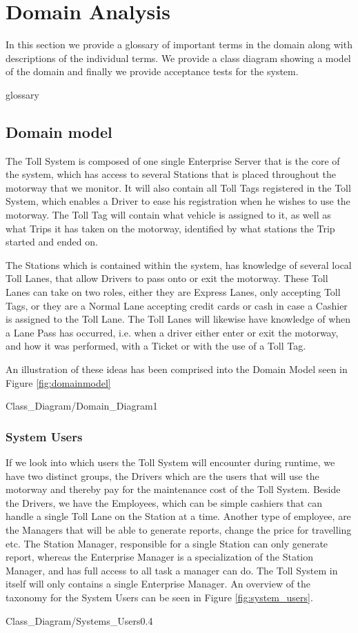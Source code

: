 \section{Domain Analysis}
In this section we provide a glossary of important terms in the domain along with descriptions of the individual terms. We provide a class diagram showing a model of the domain and finally we provide acceptance tests for the system.

{glossary}

\subsection{Domain model}
\madeby{\kj}{\mt}
The Toll System is composed of one single Enterprise Server that is the core of the system, which has access to several Stations that is placed throughout the motorway that we monitor. It will also contain all Toll Tags registered in the Toll System, which enables a Driver to ease his registration when he wishes to use the motorway. The Toll Tag will contain what vehicle is assigned to it, as well as what Trips it has taken on the motorway, identified by what stations the Trip started and ended on. 

The Stations which is contained within the system, has knowledge of several local Toll Lanes, that allow Drivers to pass onto or exit the motorway. These Toll Lanes can take on two roles, either they are Express Lanes, only accepting Toll Tags, or they are a Normal Lane accepting credit cards or cash in case a Cashier is assigned to the Toll Lane. The Toll Lanes will likewise have knowledge of when a Lane Pass has occurred, i.e. when a driver either enter or exit the motorway, and how it was performed, with a Ticket or with the use of a Toll Tag. 

An illustration of these ideas has been comprised into the Domain Model seen in Figure \ref{fig:domainmodel}

\begin{myfigure}{Class_Diagram/Domain_Diagram}{1}
\caption{Domain model of the Toll System. \madeby{\jb}{\mt}}
\label{fig:domainmodel}
\end{myfigure}

\subsubsection{System Users}
\madeby{\mb}{\af}
If we look into which users the Toll System will encounter during runtime, we have two distinct groups, the Drivers which are the users that will use the motorway and thereby pay for the maintenance cost of the Toll System. Beside the Drivers, we have the Employees, which can be simple cashiers that can handle a single Toll Lane on the Station at a time. Another type of employee, are the Managers that will be able to generate reports, change the price for travelling etc. The Station Manager, responsible for a single Station can only generate report, whereas the Enterprise Manager is a specialization of the Station Manager, and has full access to all task a manager can do. The Toll System in itself will only contains a single Enterprise Manager. An overview of the taxonomy for the System Users can be seen in Figure \ref{fig:system_users}.

\begin{myfigure}{Class_Diagram/Systems_Users}{0.4}
\caption{Systems Users. \madeby{\kj}{\jb}}
\label{fig:system_users}

\end{myfigure}

